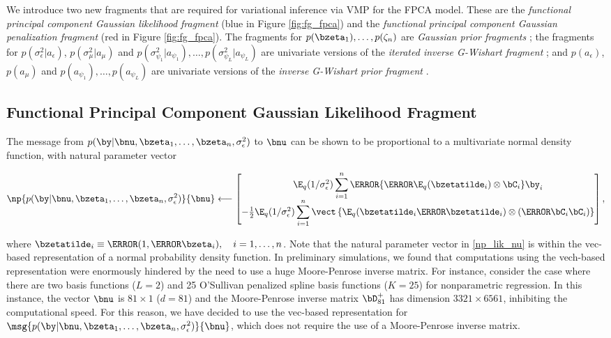 \documentclass[ba]{imsart}
\numberwithin{equation}{section}
\theoremstyle{plain}
\def\sigsqeps{\sigma^2_{\epsilon}}
\def\aeps{a_{\epsilon}}
\def\sigsqmu{\sigma^2_{\mu}}
\def\amu{a_{\mu}}
\newcommand\sigsqpsi[1]{\sigma^2_{\psi_{#1}}}
\newcommand\apsi[1]{a_{\psi_{#1}}}
\begin{document}
We introduce two new fragments that are required for variational inference via VMP for the FPCA model. These
are the \emph{functional principal component Gaussian likelihood fragment} (blue in Figure \ref{fig:fg_fpca})
and the \emph{functional principal component Gaussian penalization fragment} (red in Figure \ref{fig:fg_fpca}).
The fragments for $p (\bzeta_1), \dots, p (\zeta_n)$ are \emph{Gaussian prior fragments}
\cite[Section~4.1.1]{wand17}; the fragments for $p (\sigsqeps | \aeps)$, $p (\sigsqmu | \amu)$ and
$p (\sigsqpsi{1} | \apsi{1}), \dots, p (\sigsqpsi{L} | \apsi{L})$ are univariate versions of the \emph{iterated inverse
G-Wishart fragment} \cite[Algorithm~2]{maestrini20}; and $p (\aeps)$, $p (\amu)$ and $p (\apsi{1}), \dots, p (\apsi{L})$
are univariate versions of the \emph{inverse G-Wishart prior fragment} \cite[Algorithm~1]{maestrini20}.


\subsection{Functional Principal Component Gaussian Likelihood Fragment}
\label{sec:fpca_gauss_lik_frag}

The message from $p (\by | \bnu, \bzeta_1, \dots, \bzeta_n, \sigsqeps)$ to $\bnu$ can be shown to be
proportional to a multivariate normal density function, with natural parameter vector

\begin{equation}
	\np{p (\by | \bnu, \bzeta_1, \dots, \bzeta_n, \sigsqeps)}{\bnu}
		\longleftarrow
			\begin{bmatrix}
				\E_q (1/\sigsqeps) \displaystyle\sum_{i=1}^n \T{\left\{
					\T{\E_q (\bzetatilde_i)} \otimes \bC_i
				\right\}} \by_i \\
				-\frac12 \E_q (1/\sigsqeps) \displaystyle\sum_{i=1}^n \vect \left\{
					\E_q (\bzetatilde_i \T{\bzetatilde_i}) \otimes (\T{\bC_i} \bC_i)
				\right\}
			\end{bmatrix},
\label{np_lik_nu}
\end{equation}

\noindent where $\bzetatilde_i \equiv \T{(1, \T{\bzeta_i})}, \quad i = 1, \dots, n$. Note that the natural
parameter vector in \eqref{np_lik_nu} is within the vec-based representation of a normal probability density function.
In preliminary simulations, we found that computations using the vech-based representation were enormously hindered
by the need to use a huge Moore-Penrose inverse matrix. For instance, consider the case where
there are two basis functions ($L = 2$) and 25 O'Sullivan penalized spline basis functions ($K = 25$) for nonparametric
regression. In this instance, the vector $\bnu$ is $81 \times 1$ ($d = 81$) and the Moore-Penrose inverse matrix
$\bD_{81}^+$ has dimension $3321 \times 6561$, inhibiting the computational speed. For this reason, we have
decided to use the vec-based representation for $\msg{p (\by | \bnu, \bzeta_1, \dots, \bzeta_n, \sigsqeps)}{\bnu}$,
which does not require the
use of a Moore-Penrose inverse matrix.
\end{document}
